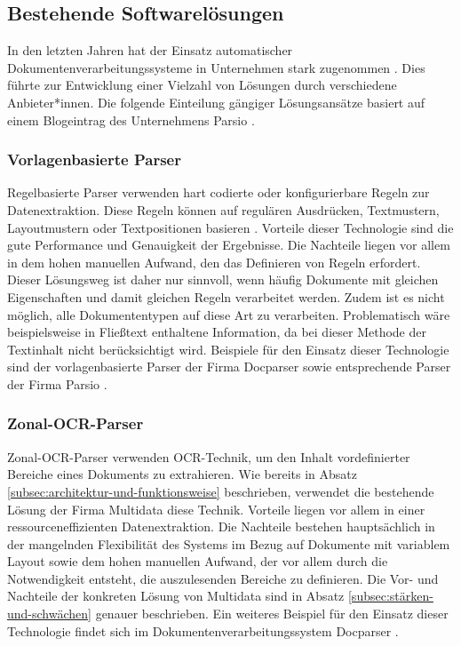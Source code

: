 \subsection{Bestehende Softwarelösungen}
\label{subsec:bestehende-softwarelösungen}

In den letzten Jahren hat der Einsatz automatischer Dokumentenverarbeitungssysteme in Unternehmen stark zugenommen \cite{PerotVincent2024LLMD}. Dies führte zur Entwicklung einer Vielzahl von Lösungen durch verschiedene Anbieter*innen. Die folgende Einteilung gängiger Lösungsansätze basiert auf einem Blogeintrag des Unternehmens Parsio \cite{parsio_pdf_extraction}.

\subsubsection{Vorlagenbasierte Parser}
\label{subsubsec:regelbasierte-ansätze}

Regelbasierte Parser verwenden hart codierte oder konfigurierbare Regeln zur Datenextraktion. Diese Regeln können auf regulären Ausdrücken, Textmustern, Layoutmustern oder Textpositionen basieren \cite{docparser_ruleBasedParsing}. Vorteile dieser Technologie sind die gute Performance und Genauigkeit der Ergebnisse. Die Nachteile liegen vor allem in dem hohen manuellen Aufwand, den das Definieren von Regeln erfordert. Dieser Lösungsweg ist daher nur sinnvoll, wenn häufig Dokumente mit gleichen Eigenschaften und damit gleichen Regeln verarbeitet werden. Zudem ist es nicht möglich, alle Dokumententypen auf diese Art zu verarbeiten. Problematisch wäre beispielsweise in Fließtext enthaltene Information, da bei dieser Methode der Textinhalt nicht berücksichtigt wird. Beispiele für den Einsatz dieser Technologie sind der vorlagenbasierte Parser der Firma Docparser \cite{docparser_ruleBasedParsing} sowie entsprechende Parser der Firma Parsio \cite{parsio_pdf_extraction}.

\subsubsection{Zonal-OCR-Parser}
\label{subsubsec:zonal-ocr-parser}

Zonal-\gls{OCR}-Parser verwenden \gls{OCR}-Technik, um den Inhalt vordefinierter Bereiche eines Dokuments zu extrahieren. Wie bereits in Absatz \ref{subsec:architektur-und-funktionsweise} beschrieben, verwendet die bestehende Lösung der Firma Multidata diese Technik. Vorteile liegen vor allem in einer ressourceneffizienten Datenextraktion. Die Nachteile bestehen hauptsächlich in der mangelnden Flexibilität des Systems im Bezug auf Dokumente mit variablem Layout sowie dem hohen manuellen Aufwand, der vor allem durch die Notwendigkeit entsteht, die auszulesenden Bereiche zu definieren. Die Vor- und Nachteile der konkreten Lösung von Multidata sind in Absatz \ref{subsec:stärken-und-schwächen} genauer beschrieben. Ein weiteres Beispiel für den Einsatz dieser Technologie findet sich im Dokumentenverarbeitungssystem Docparser \cite{docparser_zonalOCR}.


